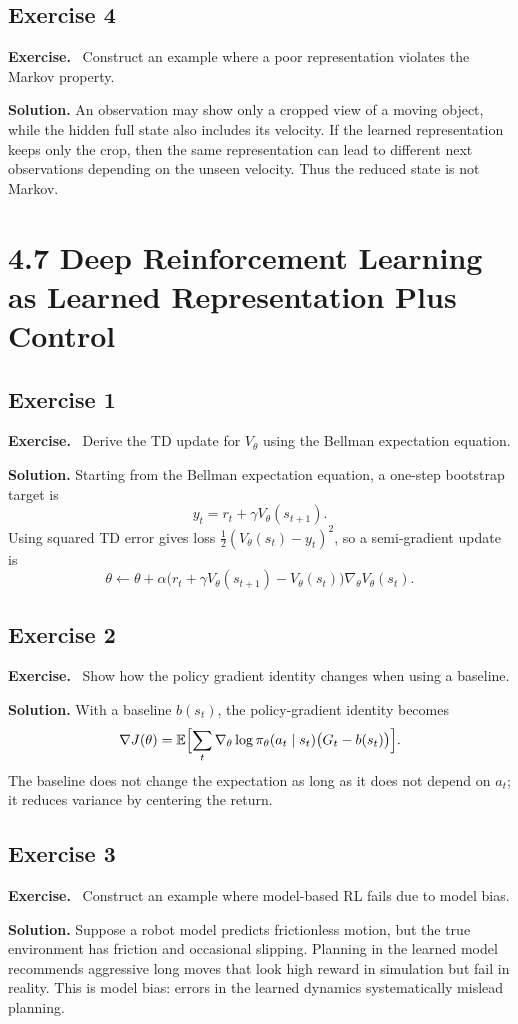 \documentclass[11pt]{article}
\newenvironment{exercisebox}{\begin{framed}\noindent\textbf{Exercise.}\ }{\end{framed}}
\begin{document}
\subsection*{Exercise 4}
\begin{exercisebox}
Construct an example where a poor representation violates the Markov property.
\end{exercisebox}
\textbf{Solution.} An observation may show only a cropped view of a moving object, while the hidden full state also includes its velocity. If the learned representation keeps only the crop, then the same representation can lead to different next observations depending on the unseen velocity. Thus the reduced state is not Markov.

\section{4.7 Deep Reinforcement Learning as Learned Representation Plus Control}
\subsection*{Exercise 1}
\begin{exercisebox}
Derive the TD update for $V_\theta$ using the Bellman expectation equation.
\end{exercisebox}
\textbf{Solution.} Starting from the Bellman expectation equation, a one-step bootstrap target is
\[
y_t=r_t+\gamma V_\theta(s_{t+1}).
\]
Using squared TD error gives loss $\tfrac12(V_\theta(s_t)-y_t)^2$, so a semi-gradient update is
\[
\theta\leftarrow \theta+\alpha\bigl(r_t+\gamma V_\theta(s_{t+1})-V_\theta(s_t)\bigr)\nabla_\theta V_\theta(s_t).
\]

\subsection*{Exercise 2}
\begin{exercisebox}
Show how the policy gradient identity changes when using a baseline.
\end{exercisebox}
\textbf{Solution.} With a baseline $b(s_t)$, the policy-gradient identity becomes
\[
\nabla J(\theta)=\mathbb E\Bigl[\sum_t \nabla_\theta\log \pi_\theta(a_t\mid s_t)\bigl(G_t-b(s_t)\bigr)\Bigr].
\]
The baseline does not change the expectation as long as it does not depend on $a_t$; it reduces variance by centering the return.

\subsection*{Exercise 3}
\begin{exercisebox}
Construct an example where model-based RL fails due to model bias.
\end{exercisebox}
\textbf{Solution.} Suppose a robot model predicts frictionless motion, but the true environment has friction and occasional slipping. Planning in the learned model recommends aggressive long moves that look high reward in simulation but fail in reality. This is model bias: errors in the learned dynamics systematically mislead planning.
\end{document}
